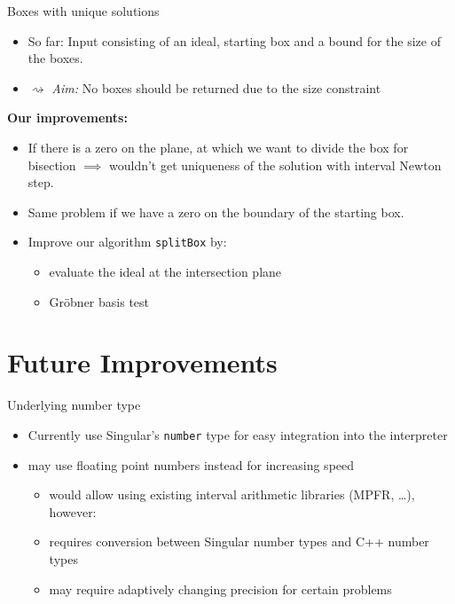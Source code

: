 \documentclass[german,10pt,xcolor=colortbl,compress, handout]{beamer}
\begin{document}
\begin{frame}{Boxes with unique solutions}
    \begin {itemize}
        \item So far: Input consisting of an ideal, starting box and a bound for the size
            of the boxes.
        \item[]$\rightsquigarrow$ \emph{Aim:} No boxes should be returned due to the size
            constraint
    \end{itemize}
    \pause
    \textbf{Our improvements:}
    \begin{itemize}
        \item If there is a zero on the plane, at which we want to divide the box for
            bisection $\implies$ wouldn't get uniqueness of the solution with interval
            Newton step.
        \item Same problem if we have a zero on the boundary of the starting box.
        \item Improve our algorithm \texttt{splitBox} by:
        \begin{itemize}
            \item evaluate the ideal at the intersection plane
            \item Gröbner basis test
        \end{itemize}
    \end{itemize}
\end{frame}

\section{Future Improvements}

\begin{frame}{Underlying number type}
    \begin{itemize}
        \item Currently use Singular's \texttt{number} type for easy integration into the
            interpreter
        \item may use floating point numbers instead for increasing speed
            \begin{itemize}
                \item would allow using existing interval arithmetic libraries (MPFR,
                    \dots), however:
                \item requires conversion between Singular number types and C++ number
                    types
                \item may require adaptively changing precision for certain problems
            \end{itemize}
    \end{itemize}
\end{frame}
\end{document}
